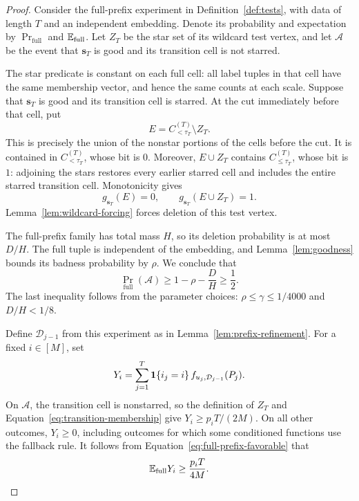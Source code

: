 \begin{proof}
Consider the full-prefix experiment in
Definition~\ref{def:tests}, with data of length $T$ and an
independent embedding.  Denote its probability and expectation
by $\Pr_{\mathrm{full}}$ and $\mathbb E_{\mathrm{full}}$.
Let $Z_T$ be the star set of its wildcard test vertex, and let
$\mathcal A$ be the event that $\mathbf s_T$ is good and its
transition cell is not starred.

The star predicate is constant on each full cell: all label
tuples in that cell have the same membership vector, and hence
the same counts at each scale.  Suppose that $\mathbf s_T$ is
good and its transition cell is starred.  At the cut immediately
before that cell, put
\[
  E=C^{(T)}_{<\tau_T}\setminus Z_T.
\]
This is precisely the union of the nonstar portions of the cells
before the cut.  It is contained in $C^{(T)}_{<\tau_T}$, whose
bit is $0$.  Moreover, $E\cup Z_T$ contains
$C^{(T)}_{\le\tau_T}$, whose bit is $1$: adjoining the stars
restores every earlier starred cell and includes the entire
starred transition cell.  Monotonicity gives
\[
  g_{\mathbf s_T}(E)=0,
  \qquad g_{\mathbf s_T}(E\cup Z_T)=1.
\]
Lemma~\ref{lem:wildcard-forcing} forces deletion of this test
vertex.

The full-prefix family has total mass $H$, so its deletion
probability is at most $D/H$.  The full tuple is independent of
the embedding, and Lemma~\ref{lem:goodness} bounds its badness
probability by $\rho$.  We conclude that
\begin{equation}
  \Pr_{\mathrm{full}}(\mathcal A)
  \ge 1-\rho-\frac{D}{H}
  \ge\frac12.
  \label{eq:full-prefix-favorable}
\end{equation}
The last inequality follows from the parameter choices:
$\rho\le\gamma\le1/4000$ and $D/H<1/8$.

Define $\mathcal D_{j-1}$ from this experiment as in
Lemma~\ref{lem:prefix-refinement}.  For a fixed $i\in[M]$, set
\[
  Y_i=\sum_{j=1}^T
    \mathbf 1\{i_j=i\}\,
    f_{u_j,\mathcal D_{j-1}}(P_j).
\]
On $\mathcal A$, the transition cell is nonstarred, so the
definition of $Z_T$ and
Equation~\eqref{eq:transition-membership} give
$Y_i\ge p_iT/(2M)$.  On all other outcomes, $Y_i\ge0$,
including outcomes for which some conditioned functions use
the fallback rule.  It follows from
Equation~\eqref{eq:full-prefix-favorable} that
\begin{equation}
  \mathbb E_{\mathrm{full}}Y_i\ge\frac{p_iT}{4M}.
  \label{eq:full-prefix-count-lower}
\end{equation}


\end{proof}
